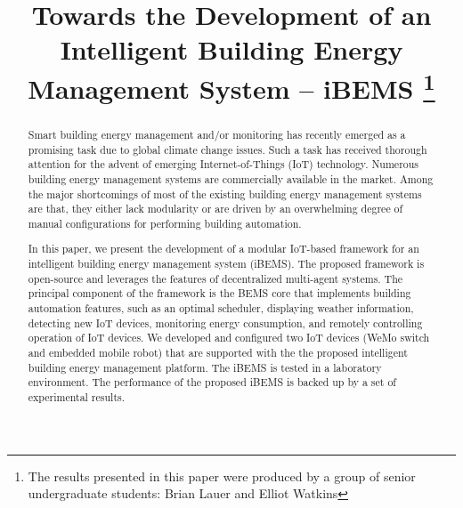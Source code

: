 \documentclass[conference]{IEEEtran}
\begin{document}
\title{ Towards the Development of an Intelligent Building Energy Management System -- iBEMS
  \thanks{The results presented in this paper were produced by a group of senior
    undergraduate students: Brian Lauer and Elliot Watkins }
}

\author{
}

\maketitle

\begin{abstract}

  Smart building energy management and/or monitoring has recently emerged as a
  promising task due to global climate change issues. Such a task has received
  thorough attention for the advent of emerging Internet-of-Things (IoT)
  technology. Numerous building energy management systems are commercially
  available in the market. Among the major shortcomings of most of the existing building energy management systems are that, they either lack modularity or are driven by an
  overwhelming degree of manual configurations for performing building
  automation.

  In this paper, we present the development of a modular IoT-based
  framework for an intelligent building energy management system (iBEMS). The
  proposed framework is open-source and leverages the features of decentralized
  multi-agent systems. The principal component of the framework is the BEMS core
  that implements building automation features, such as an optimal scheduler,
  displaying weather information, detecting new IoT devices, monitoring energy
  consumption, and remotely controlling operation of IoT devices. We developed and configured two IoT devices (WeMo switch and embedded mobile robot) that are supported with the the proposed intelligent building energy management platform. The iBEMS is tested in a laboratory environment. The performance of the proposed iBEMS is backed up by a set of experimental results. 
  
\end{abstract}
\end{document}
